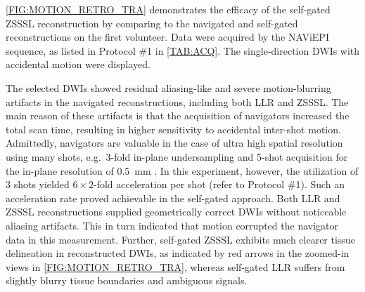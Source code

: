 \documentclass[journal,twoside,web]{ieeecolor}
\begin{document}
	\cref{FIG:MOTION_RETRO_TRA} demonstrates
	the efficacy of the self-gated ZSSSL reconstruction
	by comparing to the navigated and self-gated reconstructions 
	on the first volunteer.
	Data were acquired by the NAViEPI sequence, 
	as listed in Protocol \#1 in \cref{TAB:ACQ}.
	The single-direction DWIs with accidental motion
	were displayed.

	The selected DWIs showed residual aliasing-like and
	severe motion-blurring artifacts
	in the navigated reconstructions, 
	including both LLR and ZSSSL.
	The main reason of these artifacts is that
	the acquisition of navigators
	increased the total scan time,
	resulting in higher sensitivity to accidental inter-shot motion.
	Admittedly, navigators are valuable 
	in the case of ultra high spatial resolution
	using many shots, e.g.~3-fold in-plane undersampling and 5-shot acquisition
	for the in-plane resolution of 0.5~mm \cite{tan_2024_naviepi}.
	In this experiment, however, the utilization of 3 shots yielded
	$6 \times 2$-fold acceleration per shot (refer to Protocol \#1).
	Such an acceleration rate proved achievable in the self-gated approach.
	Both LLR and ZSSSL reconstructions supplied geometrically correct DWIs 
	without noticeable aliasing artifacts. 
	This in turn indicated that motion corrupted the navigator data 
	in this measurement.
	Further, self-gated ZSSSL exhibits much clearer tissue delineation
	in reconstructed DWIs, as indicated by red arrows in the zoomed-in views
	in \cref{FIG:MOTION_RETRO_TRA},
	whereas self-gated LLR suffers from
	slightly blurry tissue boundaries and ambiguous signals.
\end{document}
